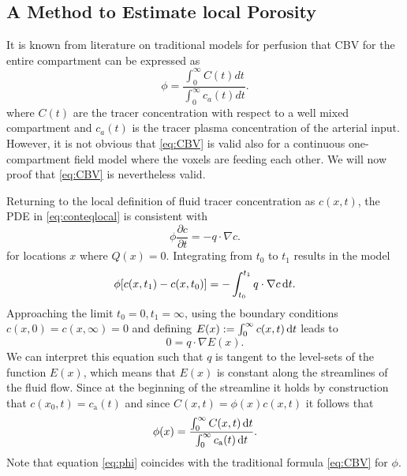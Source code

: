 \documentclass[journal,twocolumn]{IEEEtran}
\newcommand{\ca}{c_\mathrm{a}}
\begin{document}
	\subsection{A Method to Estimate local Porosity}\label{sec:CBV}
	
	It is known from literature on traditional models for perfusion that CBV for the entire compartment can be expressed as
	\begin{equation}
		\phi = \frac{\int_0^\infty C(t) dt}{\int_0^\infty c_a(t) dt}.
		\label{eq:CBV}
	\end{equation}
	where $C(t)$ are the tracer concentration with respect to a well mixed compartment and $c_a(t)$ is the tracer plasma concentration of the arterial input.
	However, it is not obvious that \eqref{eq:CBV} is valid also for a continuous one-compartment field model where the voxels are feeding each other. We will now proof that \eqref{eq:CBV} is nevertheless valid.
	
	Returning to the local definition of fluid tracer concentration as $c(x,t)$, the PDE in \eqref{eq:conteqlocal} is consistent with
	\begin{equation}
		\phi\frac{\partial c}{\partial t}  = - q \cdot \nabla c.
		\label{eq:1cmodel}
	\end{equation}
	for locations $x$ where $Q(x) = 0$.
	Integrating from $t_0$ to $t_1$ results in the model
	\begin{equation}
		\phi [c(x,t_1) - c(x,t_0)]  = - \int_{t_0}^{t_1}q \cdot  \nabla c \,\mathrm{d} t.
	\end{equation}
	Approaching the limit $t_0 = 0, t_1 = \infty$, using the boundary conditions $c(x,0) = c(x,\infty) = 0$ and defining $E(x):= \int_0^\infty c(x,t) \,\mathrm{d} t$ leads to
	\begin{equation}
		0 = q \cdot \nabla  E(x).
		\label{eq:streamlinezero}
	\end{equation}
	We can interpret this equation such that $q$ is tangent to the level-sets of the function $E(x)$, which means that $E(x)$ is constant along the streamlines of the fluid flow.
	Since at the beginning of the streamline it holds by construction that $c(x_0,t) = \ca(t)$ and since $C(x,t) = \phi(x) c(x,t)$ it follows that 	
	\begin{equation}
		\phi(x) =  \frac{ \int_{0}^{\infty} C(x,t) \diffint t }{\int_{0}^{\infty} \ca(t) \diffint t}.
		\label{eq:phi}
	\end{equation}
	Note that equation \eqref{eq:phi} coincides with the traditional formula \eqref{eq:CBV} for $\phi$.
	
\end{document}
